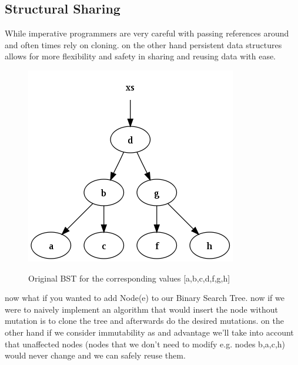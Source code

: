\documentclass[12pt,twoside]{article}
\begin{document}
\subsection{Structural Sharing}
While imperative programmers are very careful with passing references around and often times rely on cloning. on the other hand persistent data structures allows for more flexibility and safety in sharing and reusing data with ease.
\begin{figure}[H]
    \begin{center}
        {\includegraphics[scale=.65]{originalTree.png}}
    \end{center}
    \caption{ \label{figure:1} Original BST for the corresponding values [a,b,c,d,f,g,h]}
\end{figure}
now what if you wanted to add Node(e) to our Binary Search Tree. now if we were to naively implement an algorithm that would insert the node without mutation is to clone the tree and afterwards do the desired mutations. on the other hand if we consider immutability as and advantage we'll take into account that unaffected nodes (nodes that we don't need to modify e.g. nodes b,a,c,h) would never change and we can safely reuse them.
\end{document}
